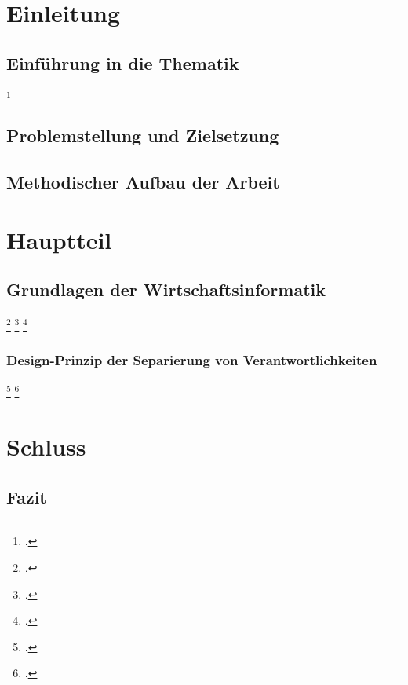 \section{Einleitung}
\subsection{Einführung in die Thematik}
\blindtext{}
\blindtext\footcite[Vgl. ][]{mswpf}

\subsection{Problemstellung und Zielsetzung}
\blindtext

\subsection{Methodischer Aufbau der Arbeit}
\blindtext

\section{Hauptteil}
\subsection{Grundlagen der Wirtschaftsinformatik}
\blindtext\footcite[Vgl. ][]{Atypisch}
\blindenumerate
\Blindtext\footcite[Vgl. ][]{msdatabind}
\blindtext\footcite[Vgl. ][415-426]{Tanenbaum2016}

\subsubsection{Design-Prinzip der Separierung von Verantwortlichkeiten}
\blindtext\footcite[Vgl. ][79]{Schelinski2019}
\blinditemize
\Blindtext\footcite[Vgl. ][34]{Digitalökonomie}

\section{Schluss}
\subsection{Fazit}
\Blindtext
